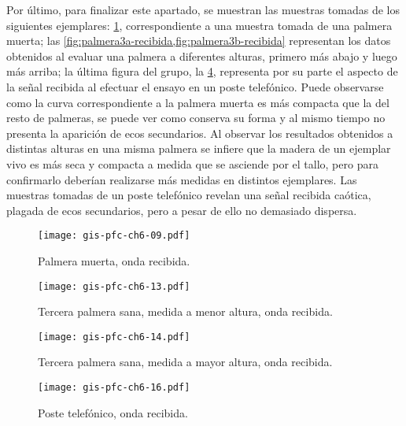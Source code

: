 Por último, para finalizar este apartado, se muestran las muestras tomadas
de los siguientes ejemplares: \cref{fig:palmeramuerta-recibida},
correspondiente a una muestra tomada de una palmera muerta; las
\cref{fig:palmera3a-recibida,fig:palmera3b-recibida} representan los datos
obtenidos al evaluar una palmera a diferentes alturas, primero más abajo y
luego más arriba; la última figura del grupo, la \cref{fig:poste-recibida},
representa por su parte el aspecto de la señal recibida al efectuar el
ensayo en un poste telefónico. Puede observarse como la curva
correspondiente a la palmera muerta es más compacta que la del resto de
palmeras, se puede ver como conserva su forma y al mismo tiempo no presenta
la aparición de ecos secundarios. Al observar los resultados obtenidos a
distintas alturas en una misma palmera se infiere que la madera de un
ejemplar vivo es más seca y compacta a medida que se asciende por el tallo,
pero para confirmarlo deberían realizarse más medidas en distintos
ejemplares. Las muestras tomadas de un poste telefónico revelan una señal
recibida caótica, plagada de ecos secundarios, pero a pesar de ello no
demasiado dispersa.

\sshortpage[]

\begin{figure}[p]
    \begin{center}
	\texttt{[image: gis-pfc-ch6-09.pdf]}
    \end{center}
    \caption[Palmera muerta (onda recibida)]{Palmera muerta, onda
    recibida.}
    \label{fig:palmeramuerta-recibida}
\end{figure}

\begin{figure}[p]
    \begin{center}
	\texttt{[image: gis-pfc-ch6-13.pdf]}
    \end{center}
    \caption[Tercera palmera sana (onda recibida)]{Tercera palmera sana,
    medida a menor altura, onda recibida.}
    \label{fig:palmera3a-recibida}
\end{figure}

\begin{figure}[p]
    \begin{center}
	\texttt{[image: gis-pfc-ch6-14.pdf]}
    \end{center}
    \caption[Tercera palmera sana (onda recibida)]{Tercera palmera sana,
    medida a mayor altura, onda recibida.}
    \label{fig:palmera3b-recibida}
\end{figure}

\begin{figure}[p]
    \begin{center}
	\texttt{[image: gis-pfc-ch6-16.pdf]}
    \end{center}
    \caption[Poste telefónico (onda recibida)]{Poste telefónico, onda
    recibida.}
    \label{fig:poste-recibida}
\end{figure}



